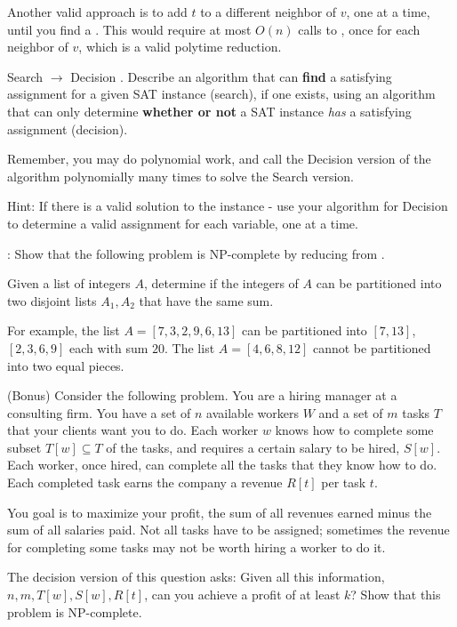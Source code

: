 \begin{questions}
\begin{solution}
    Another valid approach is to add $t$ to a different neighbor of $v$, one
    at a time, until you find a \HP. This would require at most $O(n)$ calls
    to \HP, once for each neighbor of $v$, which is a valid polytime
    reduction.
  \end{solution}

  \question[20] Search \SAT $\to$ Decision \SAT. 
  Describe an algorithm that can {\bf find} a satisfying assignment for a
  given SAT instance (search), if one exists, using an algorithm that can only
  determine {\bf whether or not} a SAT instance \emph{has} a satisfying
  assignment (decision).

  Remember, you may do polynomial work, and call the Decision version of the
  algorithm polynomially many times to solve the Search version.

  Hint: If there is a valid solution to the \SAT instance - use your algorithm
  for Decision \SAT to determine a valid assignment for each variable, one at
  a time.
  \begin{solution}
  \end{solution}

  
  \question[20] :
  Show that the following problem is NP-complete by reducing from \SSM.

  Given a list of integers $A$, determine if the integers of $A$ can be
  partitioned into two disjoint lists $A_1, A_2$ that have the same sum.

  For example, the list $A = [7, 3, 2, 9, 6, 13]$ can be partitioned into
  $[7,13]$, $[2,3,6,9]$ each with sum $20$. The list $A = [4,6,8,12]$ cannot be
  partitioned into two equal pieces.
  \begin{solution}
  \end{solution}

  \question (Bonus) Consider the following problem.
  You are a hiring manager at a consulting firm.
  You have a set of $n$ available workers $W$ and a set of $m$ tasks $T$ that
  your clients want you to do.
  Each worker $w$ knows how to complete some subset $T[w] \subseteq T$ of the
  tasks, and requires a certain salary to be hired, $S[w]$.
  Each worker, once hired, can complete all the tasks that they know
  how to do. Each completed task earns the company a revenue $R[t]$ per task
  $t$.

  You goal is to maximize your profit, the sum of all revenues earned minus
  the sum of all salaries paid.  Not all tasks have to be assigned; sometimes
  the revenue for completing some tasks may not be worth hiring a worker to do
  it. 

  The decision version of this question asks: Given all this information, $n,
  m, T[w], S[w], R[t]$, can you achieve a profit of at least $k$?  Show that
  this problem is NP-complete.
  \begin{solution}
  \end{solution}
\end{questions}



